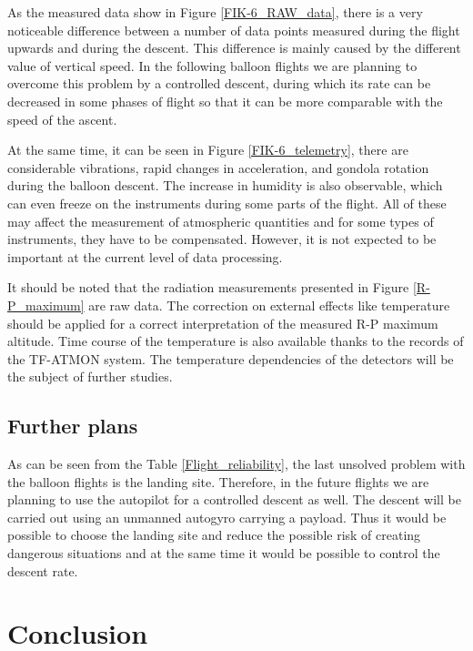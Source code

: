 \documentclass{Rpd}
\begin{document}
As the measured data show in Figure \ref{FIK-6_RAW_data}, there is a very noticeable difference between a number of data points measured during the flight upwards and during the descent. This difference is mainly caused by the  different value of vertical speed. In the following balloon flights we are planning to overcome this problem by a controlled descent, during which its rate can be decreased in some phases of flight so that it can be more comparable with the speed of the ascent.

At the same time, it can be seen in Figure \ref{FIK-6_telemetry}, there are considerable vibrations, rapid changes in acceleration, and gondola rotation during the balloon descent. The increase in humidity is also observable, which can even freeze on the instruments during some parts of the flight. All of these may affect the measurement of atmospheric quantities and for some types of instruments, they have to be compensated. However, it is not expected to be important at the current level of data processing.

It should be noted that the radiation measurements presented in Figure \ref{R-P_maximum} are raw data. The correction on external effects like temperature should be applied for a correct interpretation of the measured R-P maximum altitude. Time course of the temperature is also available thanks to the records of the TF-ATMON system. The temperature dependencies of the detectors  will be the subject of further studies.


\subsection{Further plans}

As can be seen from the Table \ref{Flight_reliability}, the last unsolved problem with the balloon flights is the landing site. Therefore, in the future flights we are planning to use the autopilot for a controlled descent as well.
The descent will be carried out using an unmanned autogyro carrying a payload. Thus it would be possible to choose the landing site and reduce the possible risk of creating dangerous situations and at the same time it would be possible to control the descent rate. 

\section{Conclusion}
\end{document}
